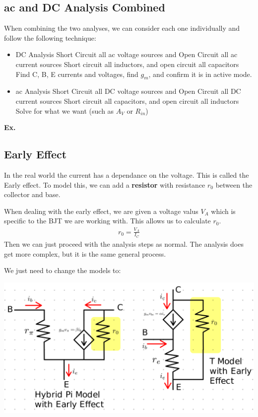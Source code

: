 \documentclass[12pt,letterpaper]{article} \usepackage{amsmath} \usepackage{graphicx} \usepackage[margin=1in]{geometry} \usepackage{longtable}  \usepackage{amssymb}
\begin{document}
	\subsection{ac and DC Analysis Combined}
	When combining the two analyses, we can consider each one individually and follow the following technique:
	\begin{itemize}
		\item DC Analysis
		\subitem Short Circuit all ac voltage sources and Open Circuit all ac current sources
		\subitem Short circuit all inductors, and open circuit all capacitors
		\subitem Find C, B, E currents and voltages, find $g_m$, and confirm it is in active mode.
		\item ac Analysis
		\subitem Short Circuit all DC voltage sources and Open Circuit all DC current sources
		\subitem Short circuit all capacitors, and open circuit all inductors
		\subitem Solve for what we want (such as $A_V$ or $R_{in}$)
	\end{itemize}

	\begin{mdframed}
		\textbf{Ex. }
	\end{mdframed}
	
	\subsection{Early Effect}
	In the real world the current has a dependance on the voltage. This is called the Early effect. To model this, we can add a \textbf{resistor} with resistance $r_0$ between the collector and base. 
	
	When dealing with the early effect, we are given a voltage valus $V_A$ which is specific to the BJT we are working with. This allows us to calculate $r_0$. 
	\begin{align*}
		r_0 = \frac{V_A}{I_C}
	\end{align*}
	Then we can just proceed with the analysis steps as normal. The analysis does get more complex, but it is the same general process. 
	
	We just need to change the models to:
	\begin{center}
		\includegraphics[width=0.8\linewidth]{hybridpi-tmodel-w-early}
	\end{center}
	
\end{document}
